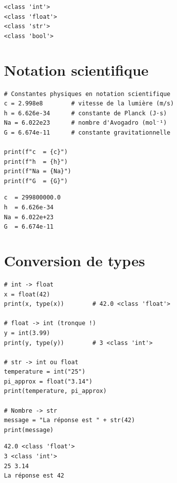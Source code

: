 \begin{codeoutput}
\begin{verbatim}
<class 'int'>
<class 'float'>
<class 'str'>
<class 'bool'>
\end{verbatim}
\end{codeoutput}

\section{Notation scientifique}

\begin{codeblock}[title=\textbf{Python --- Notation scientifique}]
\begin{verbatim}
# Constantes physiques en notation scientifique
c = 2.998e8        # vitesse de la lumière (m/s)
h = 6.626e-34      # constante de Planck (J·s)
Na = 6.022e23      # nombre d'Avogadro (mol⁻¹)
G = 6.674e-11      # constante gravitationnelle

print(f"c  = {c}")
print(f"h  = {h}")
print(f"Na = {Na}")
print(f"G  = {G}")
\end{verbatim}
\end{codeblock}

\begin{codeoutput}
\begin{verbatim}
c  = 299800000.0
h  = 6.626e-34
Na = 6.022e+23
G  = 6.674e-11
\end{verbatim}
\end{codeoutput}

\section{Conversion de types}

\begin{codeblock}[title=\textbf{Python --- Conversions}]
\begin{verbatim}
# int -> float
x = float(42)
print(x, type(x))        # 42.0 <class 'float'>

# float -> int (tronque !)
y = int(3.99)
print(y, type(y))        # 3 <class 'int'>

# str -> int ou float
temperature = int("25")
pi_approx = float("3.14")
print(temperature, pi_approx)

# Nombre -> str
message = "La réponse est " + str(42)
print(message)
\end{verbatim}
\end{codeblock}

\begin{codeoutput}
\begin{verbatim}
42.0 <class 'float'>
3 <class 'int'>
25 3.14
La réponse est 42
\end{verbatim}
\end{codeoutput}

